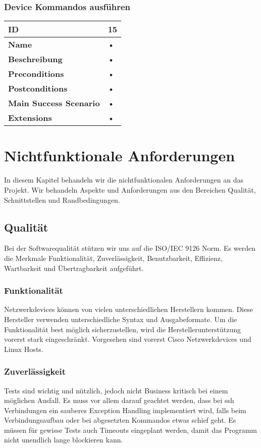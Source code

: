 \subsubsection{Device Kommandos ausführen}
\mbox{}
\begin{longtable}{| p{4cm} | p{11.7cm} |}
 \hline
 \textbf{ID} & 15\\ \hline 
 \textbf{Name} & • \\ \hline 
 \textbf{Beschreibung} & • \\ \hline 
 \textbf{Preconditions} & • \\ \hline 
 \textbf{Postconditions} & • \\ \hline 
 \textbf{Main Success Scenario} & • \\ \hline 
 \textbf{Extensions} & • \\ \hline 
\end{longtable}


 
 

\section{Nichtfunktionale Anforderungen}
In diesem Kapitel behandeln wir die nichtfunktionalen Anforderungen an das Projekt. Wir behandeln Aspekte und Anforderungen aus den Bereichen Qualität, Schnittstellen und Randbedingungen.
\subsection{Qualität}
Bei der Softwarequalität stützen wir uns auf die ISO/IEC 9126 Norm. Es werden die Merkmale Funktionalität, Zuverlässigkeit, Benutzbarkeit, Effizienz, Wartbarkeit und Übertragbarkeit aufgeführt.
\subsubsection{Funktionalität}
Netzwerkdevices können von vielen unterschiedlichen Herstellern kommen. Diese Hersteller verwenden unterschiedliche Syntax und Ausgabeformate. Um die Funktionalität best möglich sicherzustellen, wird die Herstellerunterstützung vorerst stark eingeschränkt. Vorgesehen sind vorerst Cisco Netzwerkdevices und Linux Hosts.
\subsubsection{Zuverlässigkeit}
Tests sind wichtig und nützlich, jedoch nicht Business kritisch bei einem möglichen Ausfall. Es muss vor allem darauf geachtet werden, dass bei ssh Verbindungen ein sauberes Exception Handling implementiert wird, falls beim Verbindungsaufbau oder bei abgesetzten Kommandos etwas schief geht. Es müssen für gewisse Tests auch Timeouts eingeplant werden, damit das Programm nicht unendlich lange blockieren kann.
